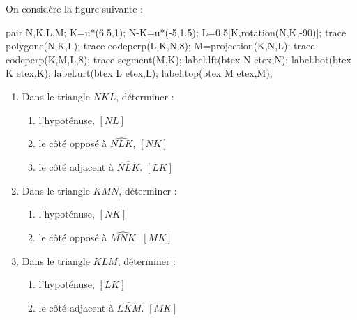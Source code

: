 \begin{corrige}
    On considère la figure suivante :

    \begin{Geometrie}[CoinHD={(7.5u,4.5u)}]        
        pair N,K,L,M;
        K=u*(6.5,1);
        N-K=u*(-5,1.5);
        L=0.5[K,rotation(N,K,-90)];
        trace polygone(N,K,L);            
        trace codeperp(L,K,N,8);
        M=projection(K,N,L);
        trace codeperp(K,M,L,8);
        trace segment(M,K);
        label.lft(btex N etex,N);
        label.bot(btex  K etex,K);
        label.urt(btex L etex,L);
        label.top(btex M etex,M);
    \end{Geometrie}

    \begin{enumerate}
        \item Dans le triangle $NKL$, déterminer :
        \begin{enumerate}
            \item l'hypoténuse, {\red  $[NL]$}
            \item le côté opposé à $\widehat{NLK}$, {\red  $[NK]$}
            \item le côté adjacent à $\widehat{NLK}$. {\red  $[LK]$}
        \end{enumerate}
        \item Dans le triangle $KMN$, déterminer :
        \begin{enumerate}
            \item l'hypoténuse, {\red  $[NK]$}
            \item le côté opposé à $\widehat{MNK}$. {\red  $[MK]$}
        \end{enumerate} 
        \item Dans le triangle $KLM$, déterminer :
        \begin{enumerate}
            \item l'hypoténuse, {\red  $[LK]$}
            \item le côté adjacent à $\widehat{LKM}$. {\red  $[MK]$}
        \end{enumerate}             
    \end{enumerate}
\end{corrige}

